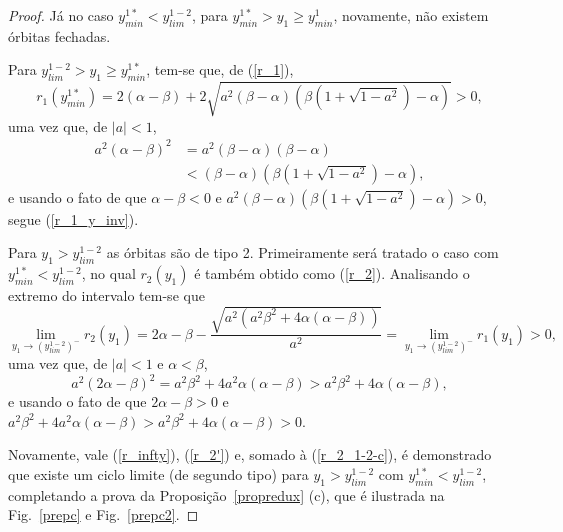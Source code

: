 \begin{proof}
Já no caso $y_{min}^{1*}< y_{lim}^{1-2}$, para $y_{min}^{1*} > y_1\geq y_{min}^1$, novamente, não existem órbitas fechadas.  

Para $y_{lim}^{1-2}>y_1\geq y_{min}^{1*}$, tem-se que, de (\ref{r_1}),
\begin{equation}
    \label{r_1_y_inv}
    r_1(y_{min}^{1*})=2(\alpha-\beta)+2\sqrt{a^2(\beta-\alpha)\left(\beta\left(1+\sqrt{1-a^2}\right)-\alpha\right)}>0,
\end{equation}
uma vez que, de $|a|<1$,
\begin{align*}
a^2(\alpha-\beta)^2&=a^2(\beta-\alpha)(\beta-\alpha)
\\&<(\beta-\alpha)\left(\beta\left(1+\sqrt{1-a^2}\right)-\alpha\right),
\end{align*}
e usando o fato de que $\alpha-\beta<0$ e $a^2(\beta-\alpha)\left(\beta\left(1+\sqrt{1-a^2}\right)-\alpha\right)>0$, segue (\ref{r_1_y_inv}).

Para $y_1>y_{lim}^{1-2}$ as órbitas são de tipo 2. Primeiramente será tratado o caso com $y_{min}^{1*}<y_{lim}^{1-2}$, no qual $r_2(y_1)$ é também obtido como (\ref{r_2}). Analisando o extremo do intervalo tem-se que
\begin{equation}
\label{r_2_1-2-c}
    \lim_{y_1\rightarrow (y_{lim}^{1-2})^-}r_2(y_1)=2\alpha-\beta-\frac{\sqrt{ a^2(a^2 \beta^2 +  4\alpha (\alpha - \beta))}}{ a^2}=\lim_{y_1\rightarrow (y_{lim}^{1-2})^-}r_1(y_1)>0,
    \end{equation}
uma vez que, de $|a|<1$ e $\alpha<\beta$,
$$
a^2(2\alpha-\beta)^2=a^2\beta^2+4a^2\alpha(\alpha-\beta)>a^2 \beta^2 +  4\alpha (\alpha - \beta),
$$
e usando o fato de que $2\alpha-\beta>0$ e $a^2\beta^2+4a^2\alpha(\alpha-\beta)>a^2 \beta^2 +  4\alpha (\alpha - \beta)>0$.

Novamente, vale (\ref{r_infty}),  (\ref{r_2'}) e, somado à (\ref{r_2_1-2-c}), é demonstrado que existe um ciclo limite (de segundo tipo) para $y_1>y_{lim}^{1-2}$ com $y_{min}^{1*}<y_{lim}^{1-2}$, completando a prova da Proposição~\ref{propredux} (c), que é ilustrada na Fig.~\ref{prepc} e Fig.~\ref{prepc2}.


\end{proof}
